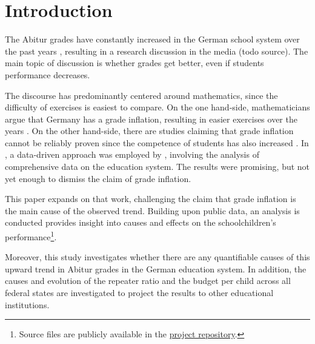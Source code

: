 \section{Introduction} \label{sec:Introduction}
The Abitur grades have constantly increased in the German school system over the past years \cite{kultusminister_konferenz_abiturnoten_nodate}, resulting in a research discussion in the media (todo source). The main topic of discussion is whether grades get better, even if students performance decreases.

The discourse has predominantly centered around mathematics, since the difficulty of exercises is easiest to compare. On the one hand-side, mathematicians argue that Germany has a grade inflation, resulting in easier exercises over the years \cite{kuhnel_modellierungskompetenz_2015, jahnke_hamburger_2014,lemmermeyer_zentralabitur_nodate}. On the other hand-side, there are studies claiming that grade inflation cannot be reliably proven since the competence of students has also increased \cite{schleithoff_noteninflation_2015}. In \citeyear{grozinger_gibt_2015}, a data-driven approach was employed by \citeauthor{grozinger_gibt_2015}, involving the analysis of comprehensive data on the education system. The results were promising, but not yet enough to dismiss the claim of grade inflation.

This paper expands on that work, challenging the claim that grade inflation is the main cause of the observed trend. Building upon public data, an analysis is conducted provides insight into causes and effects on the schoolchildren's performance\footnote{Source files are publicly available in the \href{https://github.com/KarylReyne/DataLiteracyWS23}{project repository}.}.

Moreover, this study investigates whether there are any quantifiable causes of this upward trend in Abitur grades in the German education system. In addition, the causes and evolution of the repeater ratio and the budget per child across all federal states are investigated to project the results to other educational institutions.

